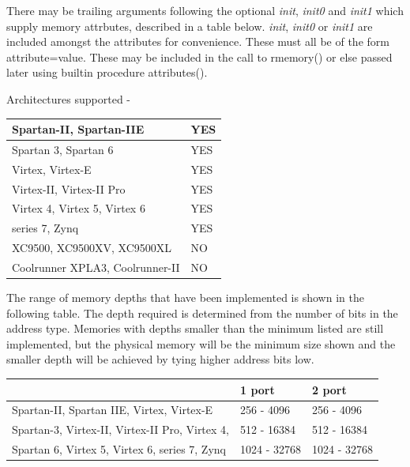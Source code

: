         There may be trailing arguments following the optional {\em init}, {\em
        init0} and {\em init1} which supply memory attrbutes, described in a
        table below. {\em init}, {\em init0} or {\em init1} are included amongst
        the attributes for convenience. These must all be of the form
        attribute=value. These may be included in the call to rmemory() or else
        passed later using builtin procedure attributes().

        
        
        Architectures supported -

        \begin{tabular}{| l | l |} \hline
        Spartan-II, Spartan-IIE         & YES   \\ \hline
        Spartan 3, Spartan 6            & YES   \\ \hline
        Virtex, Virtex-E                & YES   \\ \hline
        Virtex-II, Virtex-II Pro        & YES   \\ \hline
        Virtex 4, Virtex 5, Virtex 6    & YES   \\ \hline
        series 7, Zynq                  & YES   \\ \hline
        XC9500, XC9500XV, XC9500XL      & NO    \\ \hline
        Coolrunner XPLA3, Coolrunner-II & NO    \\ \hline
        \end{tabular}

        The range of memory depths that have been implemented is shown in the
        following table. The depth required is determined from the number of bits
        in the address type. Memories with depths smaller than the minimum listed
        are still implemented, but the physical memory will be the minimum size
        shown and the smaller depth will be achieved by tying higher address bits
        low.

        \begin{tabular}{| l | l | l |} \hline
                                 & 1 port       &   2 port    \\ \hline \hline
        Spartan-II, Spartan IIE,
        Virtex, Virtex-E         &  256 -  4096 &  256 -  4096 \\ \hline
        Spartan-3, Virtex-II,
        Virtex-II Pro,
        Virtex 4,                &  512 - 16384 &  512 - 16384 \\ \hline
        Spartan 6, Virtex 5,
        Virtex 6, series 7, Zynq & 1024 - 32768 & 1024 - 32768 \\ \hline
        \end{tabular}

